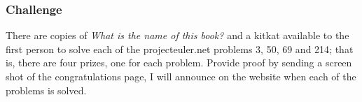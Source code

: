 \documentclass[12pt]{article}
\begin{document}
\subsubsection*{Challenge}

There are copies of \emph{What is the name of this book?} and a kitkat
available to the first person to solve each of the projecteuler.net
problems 3, 50, 69 and 214; that is, there are four prizes, one for each
problem. Provide proof by sending a screen shot of the congratulations
page, I will announce on the website when each of the problems is solved.
\end{document}
